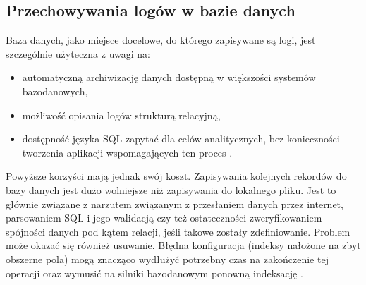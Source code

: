     \subsection{Przechowywania logów w bazie danych}
    \label{chapter:logs:history:db_format}
    Baza danych, jako miejsce docelowe, do którego zapisywane są logi, jest szczególnie użyteczna z uwagi na:
    \begin{itemize}
        \item automatyczną archiwizację danych dostępną w większości systemów bazodanowych,
        \item możliwość opisania logów strukturą relacyjną,
        \item dostępność języka SQL zapytać dla celów analitycznych, bez konieczności tworzenia aplikacji
        wspomagających ten proces \cite{logging_log_management}.
    \end{itemize}
    Powyższe korzyści mają jednak swój koszt. Zapisywania kolejnych rekordów do bazy danych jest 
    dużo wolniejsze niż zapisywania do lokalnego pliku. Jest to głównie związane z narzutem związanym
    z przesłaniem danych przez internet, parsowaniem SQL i jego walidacją czy też ostateczności
    zweryfikowaniem spójności danych pod kątem relacji, jeśli takowe zostały zdefiniowanie.
    Problem może okazać się również usuwanie. Błędna konfiguracja (indeksy nałożone na zbyt obszerne pola) mogą 
    znacząco wydłużyć potrzebny czas na zakończenie tej operacji oraz wymusić na silniki bazodanowym ponowną
    indeksację \cite{logging_log_management}.